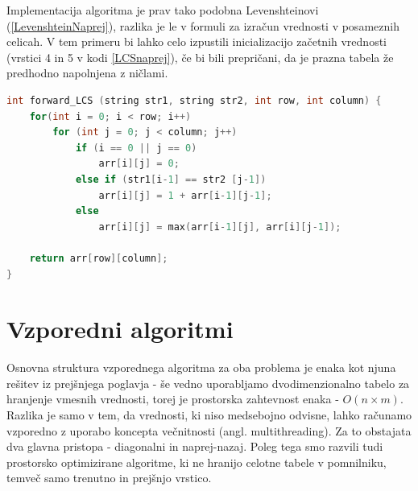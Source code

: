 \documentclass[a4paper,12pt,openright]{book}
\begin{document}
Implementacija algoritma je prav tako podobna Levenshteinovi (\ref{LevenshteinNaprej}), razlika je le v formuli za izračun vrednosti v posameznih celicah. V tem primeru bi lahko celo izpustili inicializacijo začetnih vrednosti (vrstici 4 in 5 v kodi \ref{LCSnaprej}), če bi bili prepričani, da je prazna tabela že predhodno napolnjena z ničlami. 

\bigskip \bigskip

\begin{lstlisting}[language=C++, caption={Algoritem za izračun LCS}, captionpos=b, label=LCSnaprej]
int forward_LCS (string str1, string str2, int row, int column) {
    for(int i = 0; i < row; i++) 
        for (int j = 0; j < column; j++) 
            if (i == 0 || j == 0)
                arr[i][j] = 0;
            else if (str1[i-1] == str2 [j-1])
                arr[i][j] = 1 + arr[i-1][j-1];
            else
                arr[i][j] = max(arr[i-1][j], arr[i][j-1]);

    return arr[row][column];
}
\end{lstlisting}

\chapter{Vzporedni algoritmi}

Osnovna struktura vzporednega algoritma za oba problema je enaka kot njuna rešitev iz prejšnjega poglavja - še vedno uporabljamo dvodimenzionalno tabelo za hranjenje vmesnih vrednosti, torej je prostorska zahtevnost enaka - $O(n \times m)$. Razlika je samo v tem, da vrednosti, ki niso medsebojno odvisne, lahko računamo vzporedno z uporabo koncepta večnitnosti (angl. multithreading). Za to obstajata dva glavna pristopa - diagonalni in naprej-nazaj. Poleg tega smo razvili tudi prostorsko optimizirane algoritme, ki ne hranijo celotne tabele v pomnilniku, temveč samo trenutno in prejšnjo vrstico. 
\end{document}
